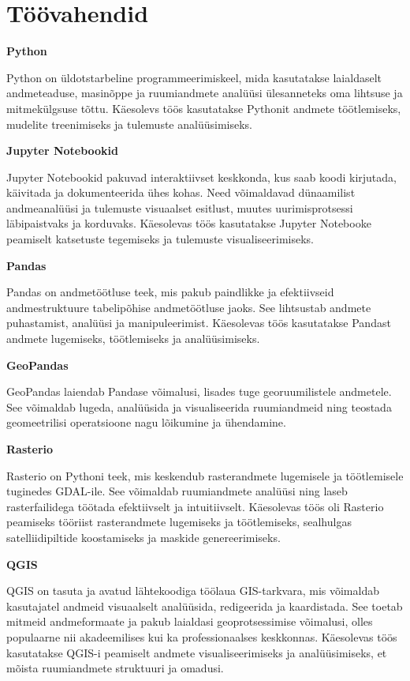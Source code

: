 \section{Töövahendid}


\textbf{Python}

Python on üldotstarbeline programmeerimiskeel, mida kasutatakse
laialdaselt andmeteaduse, masinõppe ja ruumiandmete analüüsi ülesanneteks
oma lihtsuse ja mitmekülgsuse tõttu. Käesolevs töös kasutatakse Pythonit
andmete töötlemiseks, mudelite treenimiseks ja tulemuste analüüsimiseks.



\textbf{Jupyter Notebookid}\nopagebreak[4]

Jupyter Notebookid pakuvad interaktiivset keskkonda, kus
saab koodi kirjutada, käivitada ja dokumenteerida ühes kohas. Need võimaldavad
dünaamilist andmeanalüüsi ja tulemuste visuaalset esitlust, muutes
uurimisprotsessi läbipaistvaks ja korduvaks. Käesolevas töös kasutatakse
Jupyter Notebooke peamiselt katsetuste tegemiseks ja tulemuste
visualiseerimiseks.



\textbf{Pandas}\nopagebreak[4]

Pandas on andmetöötluse teek, mis pakub paindlikke ja
efektiivseid andmestruktuure tabelipõhise andmetöötluse jaoks. See lihtsustab
andmete puhastamist, analüüsi ja manipuleerimist. Käesolevas töös
kasutatakse Pandast andmete lugemiseks, töötlemiseks ja analüüsimiseks.


\textbf{GeoPandas}\nopagebreak[4]

GeoPandas laiendab Pandase võimalusi, lisades tuge georuumilistele
andmetele. See võimaldab lugeda, analüüsida ja visualiseerida
ruumiandmeid ning teostada geomeetrilisi operatsioone nagu lõikumine ja
ühendamine.


\textbf{Rasterio}\nopagebreak[4]

Rasterio on Pythoni teek, mis keskendub rasterandmete lugemisele
ja töötlemisele tuginedes GDAL-ile. See võimaldab ruumiandmete analüüsi
ning laseb rasterfailidega töötada efektiivselt ja intuitiivselt. Käesolevas töös oli Rasterio peamiseks tööriist rasterandmete lugemiseks ja töötlemiseks, sealhulgas satelliidipiltide koostamiseks ja maskide genereerimiseks.

\textbf{QGIS}\nopagebreak[4]

QGIS on tasuta ja avatud lähtekoodiga töölaua GIS-tarkvara, mis võimaldab
kasutajatel andmeid visuaalselt analüüsida, redigeerida ja kaardistada. See
toetab mitmeid andmeformaate ja pakub laialdasi geoprotsessimise võimalusi,
olles populaarne nii akadeemilises kui ka professionaalses keskkonnas. Käesolevas
töös kasutatakse QGIS-i peamiselt andmete visualiseerimiseks ja
analüüsimiseks, et mõista ruumiandmete struktuuri ja omadusi.


